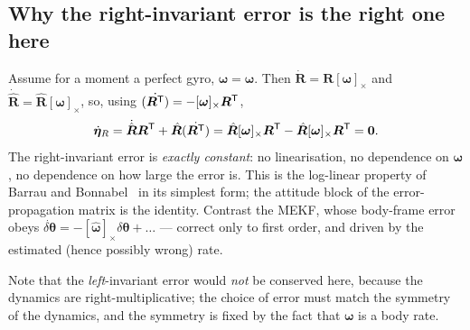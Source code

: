 \subsection{Why the right-invariant error is the right one here}
Assume for a moment a perfect gyro, $\hat{\bm{\omega}}=\bm{\omega}$. Then
$\dot{\bm{R}}=\bm{R}[\bm{\omega}]_\times$ and $\dot{\hat{\bm{R}}}=\hat{\bm{R}}[\bm{\omega}]_\times$,
so, using $\dot{(\bm{R}^{\mathsf{T}})}=-[\bm{\omega}]_\times\bm{R}^{\mathsf{T}}$,
\begin{equation}
\dot{\bm{\eta}}_R = \dot{\hat{\bm{R}}}\bm{R}^{\mathsf{T}} + \hat{\bm{R}}\dot{(\bm{R}^{\mathsf{T}})}
 = \hat{\bm{R}}[\bm{\omega}]_\times\bm{R}^{\mathsf{T}} - \hat{\bm{R}}[\bm{\omega}]_\times\bm{R}^{\mathsf{T}} = \bm{0}.
\label{eq:iekf-eta0}
\end{equation}
The right-invariant error is \emph{exactly constant}: no linearisation, no dependence on
$\bm{\omega}$, no dependence on how large the error is. This is the log-linear property of
Barrau and Bonnabel~\cite[Thm.~1]{barrau2017iekf} in its simplest form; the attitude block of the
error-propagation matrix is the identity. Contrast the MEKF, whose body-frame error obeys
$\dot{\delta\bm{\theta}}=-[\hat{\bm{\omega}}]_\times\delta\bm{\theta}+\dots$ --- correct only to
first order, and driven by the estimated (hence possibly wrong) rate.

Note that the \emph{left}-invariant error would \emph{not} be conserved here, because the dynamics
are right-multiplicative; the choice of error must match the symmetry of the dynamics, and the
symmetry is fixed by the fact that $\bm{\omega}$ is a body rate.

